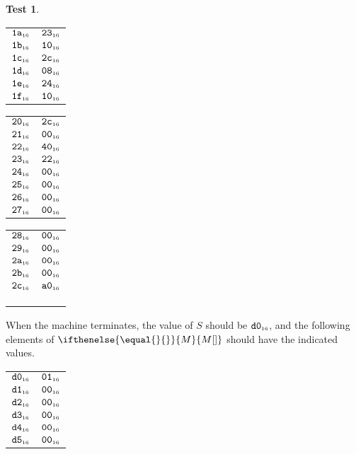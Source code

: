 \documentclass[a4paper,12pt]{article}
\makeatletter
\newcommand{\num}[1]{\texttt{\MakeLowercase{#1}}}
\newcommand{\hex}[1]{\num{#1}_{\textup{\tiny 16}}}
\newcommand{\MEM}[1]{\ifthenelse{\equal{#1}{}}{M}{M[#1]}}
\newcommand{\SP}{S}
\theoremstyle{definition}
\newtheorem{test}{Test}
\newenvironment{memtable}{%
  \begin{trivlist}
    \item
    }{%
    \end{trivlist}}
\newenvironment{memcolumn}{%
  \begin{tabular}{@{}ll@{}}
    \hline}
    {%
    \hline
  \end{tabular}}
\newcommand{\memspace}{\qquad}
\makeatother
\begin{document}
\begin{test}
\begin{memtable}
\begin{memcolumn}
      $\hex{1A}$ & $\hex{23}$ \\
      $\hex{1B}$ & $\hex{10}$ \\
      $\hex{1C}$ & $\hex{2C}$ \\
      $\hex{1D}$ & $\hex{08}$ \\
      $\hex{1E}$ & $\hex{24}$ \\
      $\hex{1F}$ & $\hex{10}$ \\
    \end{memcolumn}
    \memspace
    \begin{memcolumn}
      $\hex{20}$ & $\hex{2C}$ \\
      $\hex{21}$ & $\hex{00}$ \\
      $\hex{22}$ & $\hex{40}$ \\
      $\hex{23}$ & $\hex{22}$ \\
      $\hex{24}$ & $\hex{00}$ \\
      $\hex{25}$ & $\hex{00}$ \\
      $\hex{26}$ & $\hex{00}$ \\
      $\hex{27}$ & $\hex{00}$ \\
    \end{memcolumn}
    \memspace
    \begin{memcolumn}
      $\hex{28}$ & $\hex{00}$ \\
      $\hex{29}$ & $\hex{00}$ \\
      $\hex{2A}$ & $\hex{00}$ \\
      $\hex{2B}$ & $\hex{00}$ \\
      $\hex{2C}$ & $\hex{A0}$ \\
      \\
      \\
      \\
    \end{memcolumn}
  \end{memtable}
  When the machine terminates, the value of $\SP$ should be $\hex{D0}$, and the following elements of $\MEM{}$ should have the indicated values.
  \begin{memtable}
    \begin{memcolumn}
      $\hex{D0}$ & $\hex{01}$ \\
      $\hex{D1}$ & $\hex{00}$ \\
      $\hex{D2}$ & $\hex{00}$ \\
      $\hex{D3}$ & $\hex{00}$ \\
      $\hex{D4}$ & $\hex{00}$ \\
      $\hex{D5}$ & $\hex{00}$ \\

\end{memcolumn}
\end{memtable}
\end{test}
\end{document}
